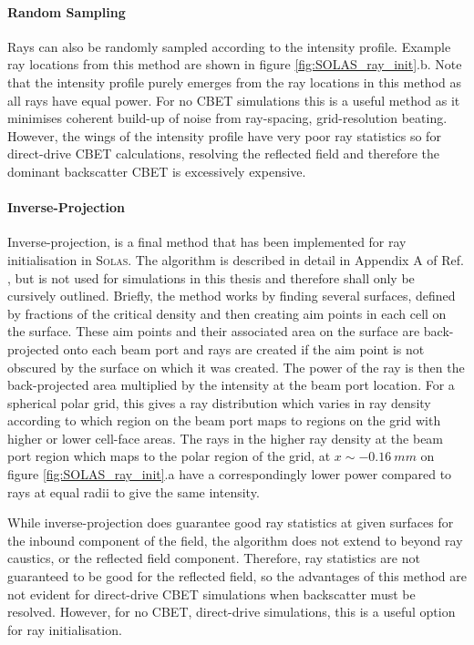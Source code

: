 \paragraph*{Random Sampling}
Rays can also be randomly sampled according to the intensity profile.
Example ray locations from this method are shown in figure \ref{fig:SOLAS_ray_init}.b.
Note that the intensity profile purely emerges from the ray locations in this method as all rays have equal power.
For no \ac{CBET} simulations this is a useful method as it minimises coherent build-up of noise from ray-spacing, grid-resolution beating.
However, the wings of the intensity profile have very poor ray statistics so for direct-drive \ac{CBET} calculations, resolving the reflected field and therefore the dominant backscatter \ac{CBET} is excessively expensive.

\paragraph*{Inverse-Projection}
Inverse-projection, is a final method that has been implemented for ray initialisation in \textsc{Solas}.
The algorithm is described in detail in Appendix A of Ref. \cite{marozas_wavelength-detuning_2018}, but is not used for simulations in this thesis and therefore shall only be cursively outlined.
Briefly, the method works by finding several surfaces, defined by fractions of the critical density and then creating aim points in each cell on the surface.
These aim points and their associated area on the surface are back-projected onto each beam port and rays are created if the aim point is not obscured by the surface on which it was created.
The power of the ray is then the back-projected area multiplied by the intensity at the beam port location.
For a spherical polar grid, this gives a ray distribution which varies in ray density according to which region on the beam port maps to regions on the grid with higher or lower cell-face areas.
The rays in the higher ray density at the beam port region which maps to the polar region of the grid, at $x\sim -0.16\ mm$ on figure \ref{fig:SOLAS_ray_init}.a have a correspondingly lower power compared to rays at equal radii to give the same intensity.

While inverse-projection does guarantee good ray statistics at given surfaces for the inbound component of the field, the algorithm does not extend to beyond ray caustics, or the reflected field component.
Therefore, ray statistics are not guaranteed to be good for the reflected field, so the advantages of this method are not evident for direct-drive \ac{CBET} simulations when backscatter must be resolved.
However, for no \ac{CBET}, direct-drive simulations, this is a useful option for ray initialisation.

